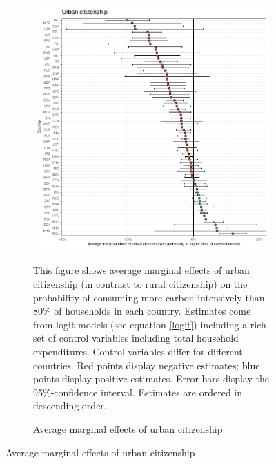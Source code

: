 \begin{figure}[ht!]\ContinuedFloat
   \centering
   \begin{subfigure}[b]{\textwidth}
   \centering
   \includegraphics{1_Figures/Analysis_Logit_Models_Marginal_Effects/Average_Marginal_Effects_affected_upper_80_urban_01_2017B.pdf}
   \caption{Average marginal effects of urban citizenship} \label{fig:Logit_ME_urban}
   \begin{subcaption2}
     This figure shows average marginal effects of urban citizenship (in contrast to rural citizenship) on the probability of consuming more carbon-intensively than 80\% of households in each country. Estimates come from logit models (see equation \ref{logit}) including a rich set of control variables including total household expenditures. Control variables differ for different countries. Red points display negative estimates; blue points display positive estimates. Error bars display the 95\%-confidence interval. Estimates are ordered in descending order.
   \end{subcaption2}
   \end{subfigure}
 \end{figure}
 \clearpage

